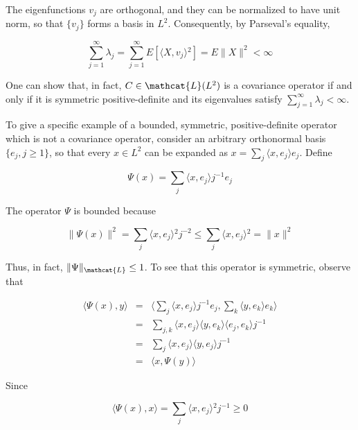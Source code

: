 The eigenfunctions $v_j$ are orthogonal, and they can be normalized to have unit norm, so that $\{ v_j \}$ forms a basis in $L^2$. Consequently, by Parseval's equality,

\begin{equation}
  \sum_{j = 1}^{\infty} \lambda_j = \sum_{j = 1}^{\infty} E[\langle{}X, v_j\rangle{}^2] = E\|X\|^2 < \infty
\end{equation}

One can show that, in fact, $C \in \mathcat{L}(L^2)$ is a covariance operator if and only if it is symmetric positive-definite and its eigenvalues satisfy $\sum_{j = 1}^{\infty}\lambda_j < \infty$.

To give a specific example of a bounded, symmetric, positive-definite operator which is not a covariance operator, consider an arbitrary orthonormal basis $\{ e_j, j \geq 1\}$, so that every $x \in L^2$ can be expanded as $x = \sum_{j} \langle{}x, e_j\rangle{} e_j$. Define

\begin{equation}
  \Psi(x) = \sum_{j} \langle{}x, e_j\rangle{} j^{-1}e_j
\end{equation}

The operator $\Psi$ is bounded because

\begin{equation}
  \| \Psi(x) \|^2 = \sum_j \langle{}x, e_j\rangle{}^2 j^{-2} \leq \sum_j \langle{}x, e_j\rangle{}^2 = \| x \|^2
\end{equation}

Thus, in fact, $\| \Psi \|_{\mathcat{L}} \leq 1$. To see that this operator is symmetric, observe that

\begin{equation}
  \begin{array}{rcl}
    \langle{} \Psi(x), y \rangle{} & = & \langle{} \sum_j \langle{}x, e_j\rangle{} j^{-1}e_j, \sum_k \langle{}y, e_k\rangle{} e_k\rangle{} \\
    & = & \sum_{j, k} \langle{}x, e_j\rangle{}\langle{}y, e_k\rangle{}\langle{}e_j, e_k\rangle{} j^{-1} \\
    & = & \sum_{j} \langle{}x, e_j\rangle{}\langle{}y, e_j\rangle{} j^{-1} \\
    & = & \langle{}x, \Psi(y)\rangle{}
  \end{array}
\end{equation}

Since

\begin{equation}
  \langle{} \Psi(x), x \rangle{} = \sum_{j} \langle{} x, e_j \rangle{}^{2} j^{-1} \geq 0
\end{equation}

